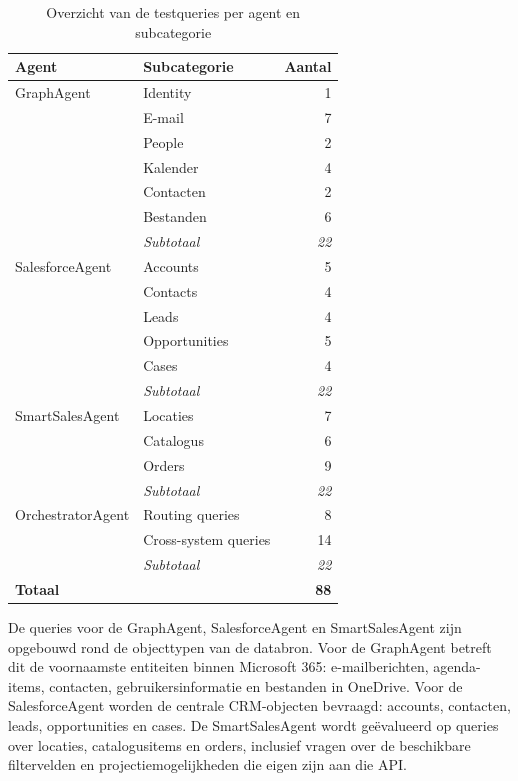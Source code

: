 \begin{table}[ht]
\centering
\caption{Overzicht van de testqueries per agent en subcategorie}
\label{tab:querycategorieen}
\renewcommand{\arraystretch}{1.3}
\begin{tabular}{llr}
\hline
\textbf{Agent} & \textbf{Subcategorie} & \textbf{Aantal} \\
\hline
GraphAgent        & Identity      & 1  \\
                  & E-mail        & 7  \\
                  & People        & 2  \\
                  & Kalender      & 4  \\
                  & Contacten     & 2  \\
                  & Bestanden     & 6  \\
                  & \textit{Subtotaal} & \textit{22} \\
\hline
SalesforceAgent   & Accounts      & 5  \\
                  & Contacts      & 4  \\
                  & Leads         & 4  \\
                  & Opportunities & 5  \\
                  & Cases         & 4  \\
                  & \textit{Subtotaal} & \textit{22} \\
\hline
SmartSalesAgent   & Locaties      & 7  \\
                  & Catalogus     & 6  \\
                  & Orders        & 9  \\
                  & \textit{Subtotaal} & \textit{22} \\
\hline
OrchestratorAgent & Routing queries      & 8  \\
                  & Cross-system queries & 14 \\
                  & \textit{Subtotaal}   & \textit{22} \\
\hline
\multicolumn{2}{l}{\textbf{Totaal}} & \textbf{88} \\
\hline
\end{tabular}
\end{table}

De queries voor de GraphAgent, SalesforceAgent en SmartSalesAgent zijn opgebouwd rond de objecttypen van de databron. Voor de GraphAgent betreft dit de voornaamste entiteiten binnen Microsoft 365: e-mailberichten, agenda-items, contacten, gebruikersinformatie en bestanden in OneDrive. Voor de SalesforceAgent worden de centrale \gls{CRM}-objecten bevraagd: accounts, contacten, leads, opportunities en cases. De SmartSalesAgent wordt geëvalueerd op queries over locaties, catalogusitems en orders, inclusief vragen over de beschikbare filtervelden en projectiemogelijkheden die eigen zijn aan die \gls{API}.

